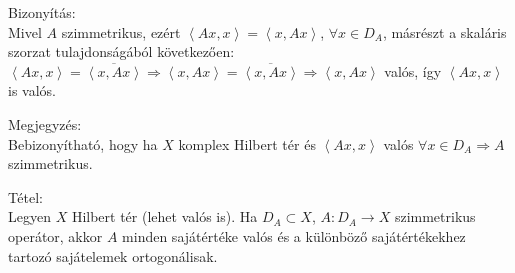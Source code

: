\documentclass[12pt,a4paper]{scrartcl}
\newenvironment{tetel}{}{}
\newenvironment{bizonyitas}{}{}
\newenvironment{megjegyzes}{}{}
\begin{document}
\begin{bizonyitas}

Bizonyítás:\\
Mivel \(A\) szimmetrikus, ezért
\(\left\langle {Ax,x} \right\rangle = \left\langle {x,Ax} \right\rangle\),
\(\forall x \in D_{A}\), másrészt a skaláris szorzat tulajdonságából
következően:
\(\left. \left\langle {Ax,x} \right\rangle = \overline{\left\langle {x,Ax} \right\rangle}\Rightarrow\left\langle {x,Ax} \right\rangle = \overline{\left\langle {x,Ax} \right\rangle}\Rightarrow\left\langle {x,Ax} \right\rangle \right.\)
valós, így \(\left\langle {Ax,x} \right\rangle\) is valós.

\end{bizonyitas}

\begin{megjegyzes}

Megjegyzés:\\
Bebizonyítható, hogy ha \(X\) komplex Hilbert tér és
\(\left\langle {Ax,x} \right\rangle\) valós
\(\left. \forall x \in D_{A}\Rightarrow A \right.\) szimmetrikus.

\end{megjegyzes}

\begin{tetel}

Tétel:\\
Legyen \(X\) Hilbert tér (lehet valós is). Ha \(D_{A} \subset X\),
\(\left. A:D_{A}\rightarrow X \right.\) szimmetrikus operátor, akkor
\(A\) minden sajátértéke valós és a különböző sajátértékekhez tartozó
sajátelemek ortogonálisak.

\end{tetel}
\end{document}
